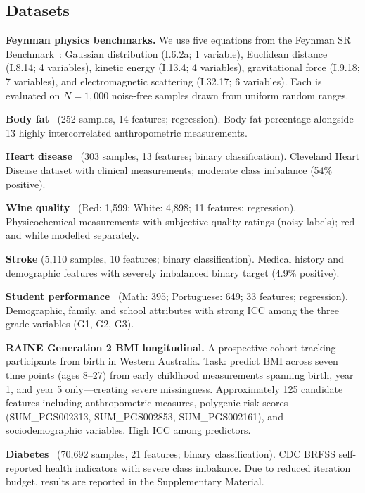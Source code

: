 \documentclass[10pt,twocolumn]{article}
\begin{document}
\subsection{Datasets}
\label{sec:datasets}

\textbf{Feynman physics benchmarks.}  We use five equations from the Feynman SR
Benchmark~\citep{udrescu2020ai}: Gaussian distribution (I.6.2a; 1 variable),
Euclidean distance (I.8.14; 4 variables), kinetic energy (I.13.4; 4 variables),
gravitational force (I.9.18; 7 variables), and electromagnetic scattering
(I.32.17; 6 variables).  Each is evaluated on $N = 1{,}000$ noise-free samples
drawn from uniform random ranges.

\textbf{Body fat}~\citep{johnson1996fitting} (252 samples, 14 features;
regression).  Body fat percentage alongside 13 highly intercorrelated
anthropometric measurements.

\textbf{Heart disease}~\citep{detrano1989international} (303 samples, 13
features; binary classification).  Cleveland Heart Disease dataset with
clinical measurements; moderate class imbalance (54\% positive).

\textbf{Wine quality}~\citep{cortez2009modeling} (Red: 1,599; White: 4,898;
11 features; regression).  Physicochemical measurements with subjective quality
ratings (noisy labels); red and white modelled separately.

\textbf{Stroke} (5,110 samples, 10 features; binary classification).  Medical
history and demographic features with severely imbalanced binary target
(4.9\% positive).

\textbf{Student performance}~\citep{cortez2008student} (Math: 395; Portuguese:
649; 33 features; regression).  Demographic, family, and school attributes with
strong ICC among the three grade variables (G1, G2, G3).

\textbf{RAINE Generation 2 BMI longitudinal.}  A prospective cohort tracking
participants from birth in Western Australia.  Task: predict BMI across seven
time points (ages 8–27) from early childhood measurements spanning birth, year
1, and year 5 only—creating severe missingness.  Approximately 125 candidate
features including anthropometric measures, polygenic risk scores
(SUM\_PGS002313, SUM\_PGS002853, SUM\_PGS002161), and sociodemographic
variables.  High ICC among predictors.

\textbf{Diabetes}~\citep{cdc2015brfss} (70,692 samples, 21 features;
binary classification).  CDC BRFSS self-reported health indicators with
severe class imbalance.  Due to reduced iteration budget, results are
reported in the Supplementary Material.
\end{document}
